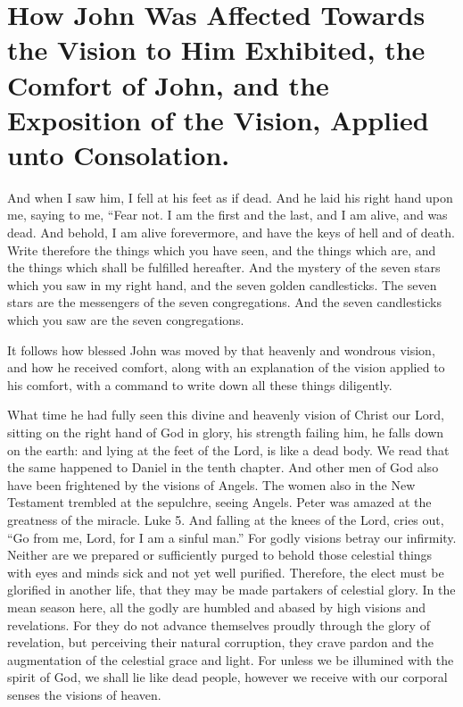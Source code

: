 \chapter[Sermon 6. How John Was Affected Towards the Vision to Him Exhibited, the Comfort of John, and the Exposition of the Vision, Applied unto Consolation.]{How John Was Affected Towards the Vision to Him Exhibited, the Comfort of John, and the Exposition of the Vision, Applied unto Consolation.}
\label{sermon:006}

And when I saw him, I fell at his feet as if dead. And he laid his right hand upon me, saying to me, “Fear not. I am the first and the last, and I am alive, and was dead. And behold, I am alive forevermore, and have the keys of hell and of death. Write therefore the things which you have seen, and the things which are, and the things which shall be fulfilled hereafter. And the mystery of the seven stars which you saw in my right hand, and the seven golden candlesticks. The seven stars are the messengers of the seven congregations. And the seven candlesticks which you saw are the seven congregations.

It follows how blessed John was moved by that heavenly and wondrous vision, and how he received comfort, along with an explanation of the vision applied to his comfort, with a command to write down all these things diligently.

What time he had fully seen this divine and heavenly vision of Christ our Lord, sitting on the right hand of God in glory, his strength failing him, he falls down on the earth: and lying at the feet of the Lord, is like a dead body. We read that the same happened to Daniel in the tenth chapter. And other men of God also have been frightened by the visions of Angels. The women also in the New Testament trembled at the sepulchre, seeing Angels. Peter was amazed at the greatness of the miracle. Luke 5. And falling at the knees of the Lord, cries out, “Go from me, Lord, for I am a sinful man.” For godly visions betray our infirmity. Neither are we prepared or sufficiently purged to behold those celestial things with eyes and minds sick and not yet well purified. Therefore, the elect must be glorified in another life, that they may be made partakers of celestial glory. In the mean season here, all the godly are humbled and abased by high visions and revelations. For they do not advance themselves proudly through the glory of revelation, but perceiving their natural corruption, they crave pardon and the augmentation of the celestial grace and light. For unless we be illumined with the spirit of God, we shall lie like dead people, however we receive with our corporal senses the visions of heaven.

